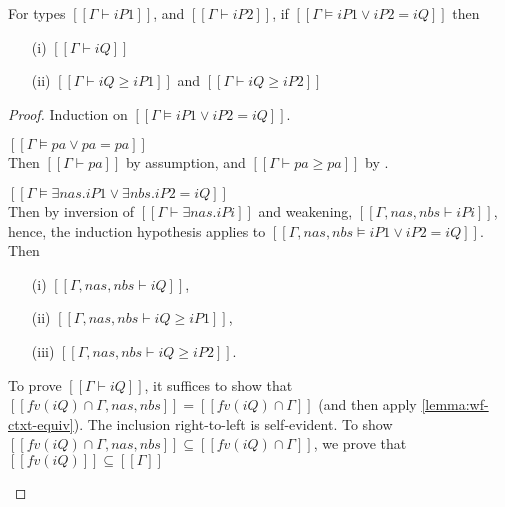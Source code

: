 \begin{lemma}
  \label{lemma:lub-soundness}
  For types $[[Γ ⊢ iP1]]$, and $[[Γ ⊢ iP2]]$,
  if $[[Γ ⊨ iP1 ∨ iP2 = iQ]]$ then
  \begin{enumerate}
    \item[(i)]  $[[Γ ⊢ iQ]]$
    \item[(ii)] $[[Γ ⊢ iQ ≥ iP1]]$ and $[[Γ ⊢ iQ ≥ iP2]]$
  \end{enumerate}
\end{lemma}
\begin{proof}
  Induction on $[[Γ ⊨ iP1 ∨ iP2 = iQ]]$.
  \begin{caseof}
  \item $[[Γ ⊨ pa ∨ pa = pa]]$\\
     Then $[[Γ ⊢ pa]]$ by assumption, and
     $[[Γ ⊢ pa ≥ pa]]$ by .
   \item $[[Γ ⊨ ∃nas.iP1 ∨ ∃nbs.iP2 = iQ]]$\\
     Then by inversion of $[[Γ ⊢ ∃nas.iPi]]$  and
     weakening, $[[Γ, nas, nbs ⊢ iPi]]$, hence, the induction
     hypothesis applies to $[[Γ, nas, nbs ⊨ iP1 ∨ iP2 = iQ]]$. Then
     \begin{itemize}
       \item[(i)] $[[Γ, nas, nbs ⊢ iQ]]$,
       \item[(ii)] $[[Γ, nas, nbs ⊢ iQ ≥ iP1]]$,
       \item[(iii)] $[[Γ, nas, nbs ⊢ iQ ≥ iP2]]$.
     \end{itemize}

     To prove $[[Γ ⊢ iQ]]$, it suffices to show that
     $[[fv(iQ) ∩ {Γ, nas, nbs}]] = [[fv(iQ) ∩ {Γ}]]$ (and then apply \cref{lemma:wf-ctxt-equiv}).
     The inclusion right-to-left is self-evident. To show
     $[[fv(iQ) ∩ {Γ, nas, nbs}]] \subseteq [[fv(iQ) ∩ {Γ}]]$, we prove that 
     $[[fv(iQ)]] \subseteq [[{Γ}]]$


\end{caseof}
\end{proof}
